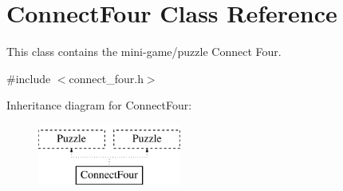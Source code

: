 \hypertarget{classConnectFour}{\section{Connect\-Four Class Reference}
\label{classConnectFour}
}


This class contains the mini-\/game/puzzle Connect Four.  




{\ttfamily \#include $<$connect\-\_\-four.\-h$>$}

Inheritance diagram for Connect\-Four\-:\begin{figure}[H]
\begin{center}
\leavevmode
\includegraphics[height=2.000000cm]{classConnectFour}
\end{center}
\end{figure}
